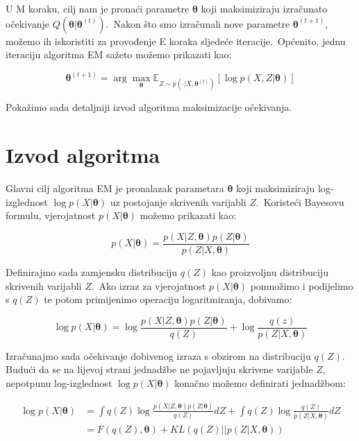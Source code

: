 \documentclass[diplomskirad]{fer}
\begin{document}
U M koraku, cilj nam je pronaći parametre $\bm{\theta}$ koji maksimiziraju izračunato očekivanje $Q (\bm{\theta} | \bm{\theta}^{(t)})$.\
Nakon što smo izračunali nove parametre $\bm{\theta}^{(t + 1)}$, možemo ih iskoristiti za provođenje E koraka sljedeće iteracije.\ 
Općenito, jednu iteraciju algoritma EM sažeto možemo prikazati kao:

\begin{equation}
  \bm{\theta}^{(t + 1)} = \arg \max_{\bm{\theta}} \mathbb{E}_{Z \sim p(\cdot | X, \bm{\theta}^{(t)})} \left[ \log p(X, Z | \bm{\theta}) \right]
  \label{eq:em_alg_basic}
\end{equation}

Pokažimo sada detaljniji izvod algoritma maksimizacije očekivanja.\

\section{Izvod algoritma}
\label{sek:izvod_em}

Glavni cilj algoritma EM je pronalazak parametara $\bm{\theta}$ koji maksimiziraju log-izglednost $\log p(X | \bm{\theta})$ uz postojanje skrivenih varijabli $Z$.\ Koristeći Bayesovu formulu, vjerojatnost $p(X | \bm{\theta})$ možemo prikazati kao:

\begin{equation}
  p(X | \bm{\theta}) = \frac{p(X | Z, \bm{\theta}) p(Z | \bm{\theta})}{p(Z | X, \bm{\theta})}
  \label{eq:em_bayes}
\end{equation}

\pagebreak

Definirajmo sada zamjensku distribuciju $q(Z)$ kao proizvoljnu distribuciju skrivenih varijabli $Z$.\ Ako izraz za vjerojatnost $p(X | \bm{\theta})$ pomnožimo i podijelimo s $q(Z)$ te potom primijenimo operaciju logaritmiranja, dobivamo:

\begin{equation}
  \log p(X | \bm{\theta}) = \log \frac{p(X | Z, \bm{\theta}) p(Z | \bm{\theta})}{q(Z)} + \log \frac{q(z)}{p(Z | X, \bm{\theta})}
  \label{eq:em_log}
\end{equation}

Izračunajmo sada očekivanje dobivenog izraza s obzirom na distribuciju $q(Z)$. Budući da se na lijevoj strani jednadžbe ne pojavljuju skrivene varijable $Z$, nepotpunu log-izglednost $\log p(X | \bm{\theta})$ konačno možemo definirati jednadžbom:

\begin{equation}
  \begin{aligned}
    \log p(X | \bm{\theta}) &= \int q(Z) \log \frac{p(X | Z, \bm{\theta}) p(Z | \bm{\theta})}{q(Z)} dZ + \int q(Z) \log \frac{q(Z)}{p(Z | X, \bm{\theta})} dZ \\
                            &= F(q(Z), \bm{\theta}) + KL(q(Z) || p(Z | X, \bm{\theta}))
  \end{aligned}
  \label{eq:em_general_form}
\end{equation}
\end{document}
